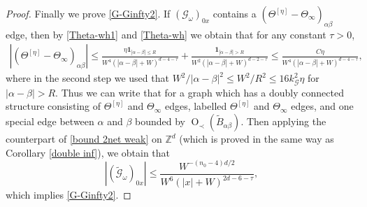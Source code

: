 \documentclass{article}
\newcommand{\1}{\mathds{1}}
\numberwithin{equation}{section}
\newcommand{\al}{\alpha}
\newcommand{\be}{\begin{equation}}
\newcommand{\ee}{\end{equation}}
\renewcommand{\cal}{\mathcal}
\newcommand{\wh}{\widehat}
\newcommand{\wt}{\widetilde}
\renewcommand{\leq}{\leqslant}
\renewcommand{\le}{\leq}
\newcommand{\Z}{\mathbb{Z}}
\newcommand{\dashed}{\text{diffusive}}
\DeclareMathOperator{\OO}{O}
\theoremstyle{plain} %
\theoremstyle{remark}
\begin{document}
\begin{proof}
Finally we prove \eqref{G-Ginfty2}. If $(\cal G_\omega)_{0x}$ contains a  $(\Theta^{[\eta]}-\Theta_\infty)_{\al\beta}$ edge, then by \eqref{Theta-wh1} and \eqref{Theta-wh} we obtain that for any constant $\tau>0$,
\begin{align}\label{Deltatheta1}
\left|(\Theta^{[\eta]}-\Theta_\infty)_{\al\beta}\right| \le \frac{\eta \mathbf 1_{|\al-\beta|\le R}}{W^4 (|\al-\beta|+W)^{d-4-\tau}}  + \frac{\mathbf 1_{|\al-\beta|> R}}{W^2(|\al-\beta|+W)^{d-2-\tau}} \le  \frac{C\eta }{W^4(|\al-\beta|+W)^{d-4-\tau}} ,
\end{align}
where in the second step we used that $W^2/| \al-\beta|^{2}\le W^2/R^2\le 16k_{\cal G}^2\eta$ for $|\al-\beta|>R$. Thus we can write that \smash{$\cal G_\omega= \eta  \wt{\cal G}_{\omega}$} for a graph \smash{$\wt{\cal G}_{\omega}$} which has a doubly connected structure consisting of $\Theta^{[\eta]}$ and $\Theta_\infty$ edges, labelled $\Theta^{[\eta]}$ and $\Theta_\infty$ edges, and one special edge between $\al$ and $\beta$ bounded by $\OO_\prec(\wt B_{\al\beta}).$ Then applying the counterpart of \eqref{bound 2net weak} on $\Z^d$ (which is proved in the same way as Corollary \ref{double inf}), we obtain that %
$$ \left|(\wt{\cal G}_\omega)_{0x}\right|\le  \frac{W^{-(n_0-4)d/2}}{W^6(|x|+W)^{2d-6-\tau}} %
,$$
which implies \eqref{G-Ginfty2}. %

\end{proof}
\end{document}
